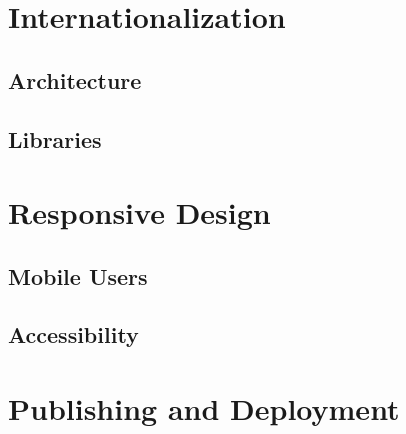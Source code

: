 \section{Internationalization}
\label{sec:i18n}

\subsection{Architecture}
\subsection{Libraries}

\section{Responsive Design}
\label{sec:responsive}

\subsection{Mobile Users}

\subsection{Accessibility}

\section{Publishing and Deployment}
\label{publishing}
